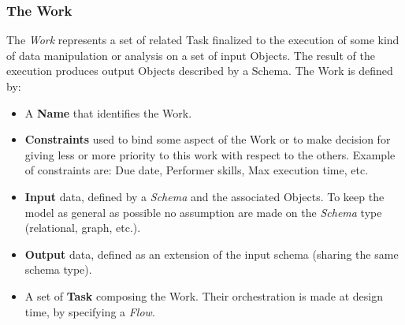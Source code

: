 \subsubsection{The Work}\label{data:work}
The \emph{Work} represents a set of related Task finalized to the execution of
some kind of data manipulation or analysis on a set of input Objects. The
result of the execution produces output Objects described by a Schema. The Work
is defined by:
\begin{itemize}
    \item A \textbf{Name} that identifies the Work.

    \item \textbf{Constraints} used to bind some aspect of the Work or to make
    decision for giving less or more priority to this work with respect to the
    others. Example of constraints are: Due date, Performer skills, Max execution
    time, etc.

    \item \textbf{Input} data, defined by a \emph{Schema} and the associated
    Objects. To keep the model as general as possible no assumption are made on
    the \emph{Schema} type (relational, graph, etc.).
    \item \textbf{Output} data, defined as an extension of the input schema
    (sharing the same schema type).

    \item A set of \textbf{Task} composing the Work. Their orchestration is made
    at design time, by specifying a \emph{Flow}.
\end{itemize}

